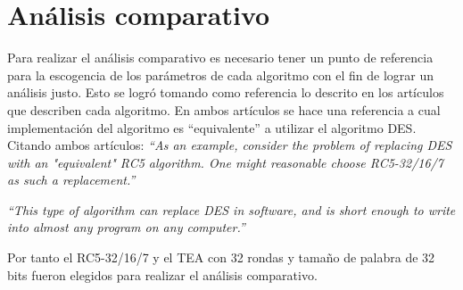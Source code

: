 \clearpage
\section{Análisis comparativo}
Para realizar el análisis comparativo es necesario tener un punto de referencia para la escogencia de los parámetros de cada algoritmo con el fin de lograr un análisis justo. Esto se logró tomando como referencia lo descrito en los artículos que describen cada algoritmo. En ambos artículos se hace una referencia a cual implementación del algoritmo es ``equivalente'' a utilizar el algoritmo DES. Citando ambos artículos:
\cite{rivest}
    \emph{``As an example, consider the problem of replacing DES with an "equivalent" RC5 algorithm. One might reasonable choose RC5-32/16/7 as such a replacement.''}

\cite{tea}
   \emph{``This type of algorithm can replace DES in software, and is short enough to write into almost any program on any computer.''}
 
Por tanto el RC5-32/16/7 y el TEA con 32 rondas y tamaño de palabra de 32 bits fueron elegidos para realizar el análisis comparativo.
